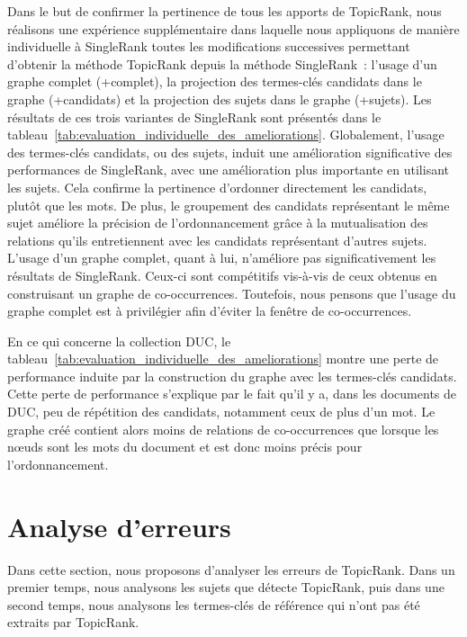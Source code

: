     Dans le but de confirmer la pertinence de tous les apports de TopicRank,
    nous réalisons une expérience supplémentaire dans laquelle nous appliquons
    de manière individuelle à SingleRank toutes les modifications successives
    permettant d'obtenir la méthode TopicRank depuis la méthode SingleRank~:
    l'usage d'un graphe complet (+complet), la projection des termes-clés
    candidats dans le graphe (+candidats) et la projection des sujets dans le
    graphe (+sujets). Les résultats de ces trois variantes de SingleRank sont
    présentés dans le
    tableau~\ref{tab:evaluation_individuelle_des_ameliorations}. Globalement,
    l'usage des termes-clés candidats, ou des sujets, induit une amélioration
    significative des performances de SingleRank, avec une amélioration plus
    importante en utilisant les sujets. Cela confirme la pertinence d'ordonner
    directement les candidats, plutôt que les mots. De plus, le groupement des
    candidats représentant le même sujet améliore la précision de
    l'ordonnancement grâce à la mutualisation des relations qu'ils entretiennent
    avec les candidats représentant d'autres sujets. L'usage d'un graphe
    complet, quant à lui, n'améliore pas significativement les résultats de
    SingleRank. Ceux-ci sont compétitifs vis-à-vis de ceux obtenus en
    construisant un graphe de co-occurrences. Toutefois, nous pensons que
    l'usage du graphe complet est à privilégier afin d'éviter la fenêtre de
    co-occurrences.
    
    En ce qui concerne la collection DUC, le
    tableau~\ref{tab:evaluation_individuelle_des_ameliorations} montre une perte
    de performance induite par la construction du graphe avec les termes-clés
    candidats. Cette perte de performance s'explique par le fait qu'il y a, dans
    les documents de DUC, peu de répétition des candidats, notamment ceux de
    plus d'un mot. Le graphe créé contient alors moins de relations de
    co-occurrences que lorsque les n\oe{}uds sont les mots du document et est
    donc moins précis pour l'ordonnancement.

  \section{Analyse d'erreurs}
  \label{sec:analyse_d_erreurs}
    Dans cette section, nous proposons d'analyser les erreurs de TopicRank. Dans
    un premier temps, nous analysons les sujets que détecte TopicRank, puis dans
    une second temps, nous analysons les termes-clés de référence qui n'ont pas
    été extraits par TopicRank.

